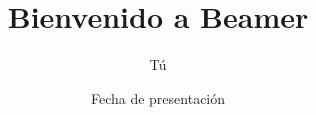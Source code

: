 \documentclass{beamer}
\title{Bienvenido a Beamer}
\author{Tú}
\institute{De donde vienes}
\date{Fecha de presentación}
\begin{document}
\begin{frame}
\titlepage %
\end{frame}
\end{document}
